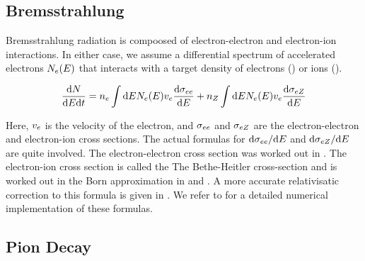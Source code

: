 \subsection{Bremsstrahlung}

Bremsstrahlung radiation is compoosed of electron-electron and electron-ion interactions.
In either case, 
we assume a 
differential spectrum of accelerated electrons $N_e(E)$ 
that interacts with a target density of electrons (\ElectronDensity) or ions (\IonDensity).

\begin{equation}
  \frac{\text{d} N}{\text{d}E\text{d}t} =
  n_e \int \text{d}E
  N_e(E) v_e
  \frac{\text{d}\sigma_{ee}}{\text{d}E} +
  n_Z \int \text{d}E
  N_e(E) v_e
  \frac{\text{d}\sigma_{eZ}}{\text{d}E}
\end{equation}

Here, $v_e$ is the velocity of the
electron, and $\sigma_{ee}$ and
$\sigma_{eZ}$ are the electron-electron and
electron-ion cross sections.
The actual formulas for 
$\text{d}\sigma_{ee}/\text{d}E$
and 
$\text{d}\sigma_{eZ}/\text{d}E$
are quite involved.  The electron-electron cross section was worked out
in \cite{haug_1975a_bremsstrahlung-production}.  The electron-ion cross
section is called the The Bethe-Heitler cross-section and is worked
out in the Born approximation in \cite{heitler_1954a_quantum-theory}
and \cite{koch_1959a_bremsstrahlung-cross-section}.  A more
accurate relativisatic correction to this formula is given in
\cite{haug_1997a_nonrelativistic-bremsstrahlung}.  We refer
to \cite{houck_2006a_models-nonthermal} for a detailed numerical
implementation of these formulas.

\subsection{Pion Decay}

